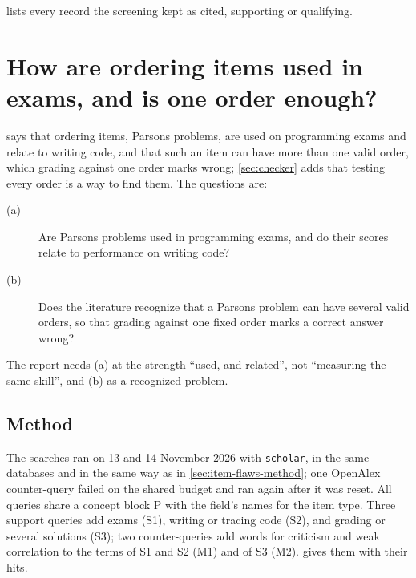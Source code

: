  lists every record the screening kept as cited,
supporting or qualifying.



\chapter{How are ordering items used in exams, and is one order enough?}
\label{app:parsons}

 says that ordering items, Parsons problems, are used on
programming exams and relate to writing code, and that such an item can
have more than one valid order, which grading against one order marks
wrong; \cref{sec:checker} adds that testing every order is a way to find
them.  The questions are:
\begin{description}
  \item[(a)] Are Parsons problems used in programming exams, and do their
    scores relate to performance on writing code?
  \item[(b)] Does the literature recognize that a Parsons problem can have
    several valid orders, so that grading against one fixed order marks a
    correct answer wrong?
\end{description}
The report needs (a) at the strength \enquote{used, and related}, not
\enquote{measuring the same skill}, and (b) as a recognized problem.

\section{Method}
\label{sec:parsons-method}

The searches ran on 13 and 14 November 2026 with \texttt{scholar}, in the
same databases and in the same way as in \cref{sec:item-flaws-method}; one
OpenAlex counter-query failed on the shared budget and ran again after it
was reset.  All queries share a concept block P with the field's names for
the item type.  Three support queries add exams (S1), writing or tracing
code (S2), and grading or several solutions (S3); two counter-queries add
words for criticism and weak correlation to the terms of S1 and S2 (M1)
and of S3 (M2).   gives them with their
hits.

